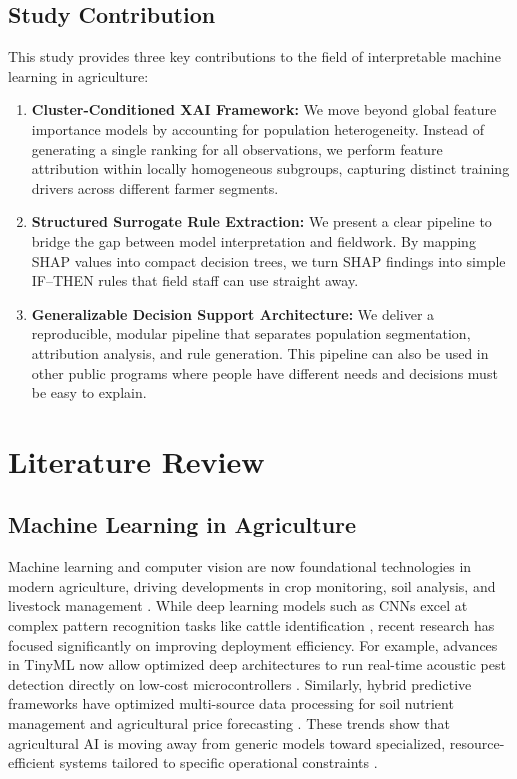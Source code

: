 \documentclass[fleqn,10pt,lineno]{wlpeerj}
\begin{document}
\subsection*{Study Contribution}
This study provides three key contributions to the field of interpretable machine learning in agriculture:
\begin{enumerate}
    \item \textbf{Cluster-Conditioned XAI Framework:} We move beyond global feature importance models by accounting for population heterogeneity. Instead of generating a single ranking for all observations, we perform feature attribution within locally homogeneous subgroups, capturing distinct training drivers across different farmer segments.
    \item \textbf{Structured Surrogate Rule Extraction:} We present a clear pipeline to bridge the gap between model interpretation and fieldwork. By mapping SHAP values into compact decision trees, we turn SHAP findings into simple IF--THEN rules that field staff can use straight away.
    \item \textbf{Generalizable Decision Support Architecture:} We deliver a reproducible, modular pipeline that separates population segmentation, attribution analysis, and rule generation. This pipeline can also be used in other public programs where 
people have different needs and decisions must be easy to explain.
\end{enumerate}

\section{Literature Review}

\subsection{Machine Learning in Agriculture}
Machine learning and computer vision are now foundational technologies in modern agriculture, driving developments in crop monitoring, soil analysis, and livestock management \citep{liakos2018}. While deep learning models such as CNNs excel at complex pattern recognition tasks like cattle identification \citep{hossain2022cattle}, recent research has focused significantly on improving deployment efficiency. For example, advances in TinyML now allow optimized deep architectures to run real-time acoustic pest detection directly on low-cost microcontrollers \citep{kazeneza2026}. Similarly, hybrid predictive frameworks have optimized multi-source data processing for soil nutrient management \citep{ennaji2023nutrient} and agricultural price forecasting \citep{zhao2026}. These trends show that agricultural AI is moving away from generic models toward specialized, resource-efficient systems tailored to specific operational constraints \citep{kamilaris2018}.
\end{document}
